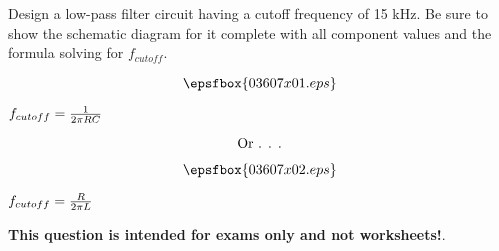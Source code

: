 

Design a low-pass filter circuit having a cutoff frequency of 15 kHz.  Be sure to show the schematic diagram for it complete with all component values and the formula solving for $f_{cutoff}$.

\vskip 50pt







$$\epsfbox{03607x01.eps}$$

$f_{cutoff} = {1 \over {2 \pi RC}}$

\vskip 10pt

$$\hbox{Or . . .}$$

$$\epsfbox{03607x02.eps}$$

$f_{cutoff} = {R \over {2 \pi L}}$







{\bf This question is intended for exams only and not worksheets!}.



